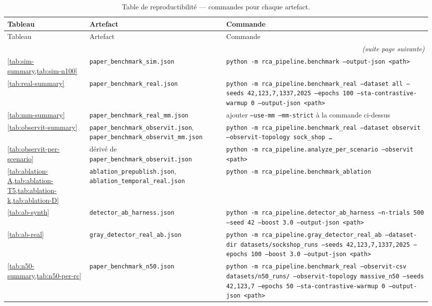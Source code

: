\documentclass[a4paper,11pt,oneside]{report}
\begin{document}
\begin{longtable}{p{}p{}p{}}
\caption{Table de reproductibilit\'e --- commandes pour chaque artefact.}
\label{tab:repro}\\
\toprule
Tableau & Artefact & Commande \\
\midrule
\endfirsthead
\toprule
Tableau & Artefact & Commande \\
\midrule
\endhead
\midrule
\multicolumn{3}{r}{\itshape (suite page suivante)} \\
\endfoot
\bottomrule
\endlastfoot
\cref{tab:sim-summary,tab:sim-n100} & \texttt{paper\_benchmark\_sim.json} & \texttt{python -m rca\_pipeline.benchmark --output-json <path>} \\
\cref{tab:real-summary} & \texttt{paper\_benchmark\_real.json} & \texttt{python -m rca\_pipeline.benchmark\_real --dataset all --seeds 42,123,7,1337,2025 --epochs 100 --sta-contrastive-warmup 0 --output-json <path>} \\
\cref{tab:mm-summary} & \texttt{paper\_benchmark\_real\_mm.json} & ajouter \texttt{--use-mm --mm-strict} \`a la commande ci-dessus \\
\cref{tab:observit-summary} & \texttt{paper\_benchmark\_observit.json}, \texttt{paper\_benchmark\_observit\_mm.json} & \texttt{python -m rca\_pipeline.benchmark\_real --dataset observit --observit-topology sock\_shop \ldots} \\
\cref{tab:observit-per-scenario} & d\'eriv\'e de \texttt{paper\_benchmark\_observit.json} & \texttt{python -m rca\_pipeline.analyze\_per\_scenario --observit <path>} \\
\cref{tab:ablation-A,tab:ablation-T5,tab:ablation-k,tab:ablation-D} & \texttt{ablation\_prepublish.json}, \texttt{ablation\_temporal\_real.json} & \texttt{python -m rca\_pipeline.benchmark\_ablation} \\
\cref{tab:ab-synth} & \texttt{detector\_ab\_harness.json} & \texttt{python -m rca\_pipeline.detector\_ab\_harness --n-trials 500 --seed 42 --boost 3.0 --output-json <path>} \\
\cref{tab:ab-real} & \texttt{gray\_detector\_real\_ab.json} & \texttt{python -m rca\_pipeline.gray\_detector\_real\_ab --dataset-dir datasets/sockshop\_runs --seeds 42,123,7,1337,2025 --epochs 100 --boost 3.0 --output-json <path>} \\
\cref{tab:n50-summary,tab:n50-per-rc} & \texttt{paper\_benchmark\_n50.json} & \texttt{python -m rca\_pipeline.benchmark\_real --observit-csv datasets/n50\_runs/ --observit-topology massive\_n50 --seeds 42,123,7 --epochs 50 --sta-contrastive-warmup 0 --output-json <path>} \\

\end{longtable}
\end{document}
